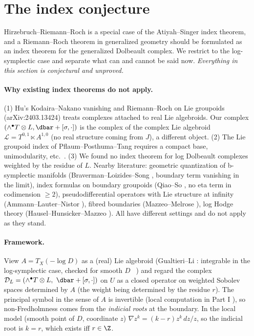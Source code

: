 \section{The index conjecture}\label{sec:index}
Hirzebruch--Riemann--Roch is a special case of the Atiyah--Singer index theorem, and a Riemann--Roch theorem in generalized geometry should be formulated as an index theorem for the generalized Dolbeault complex. We restrict to the log-symplectic case and separate what can and cannot be said now. \emph{Everything in this section is conjectural and unproved.}

\paragraph{Why existing index theorems do not apply.} (1) Hu's Kodaira--Nakano vanishing and Riemann--Roch on Lie groupoids (arXiv:2403.13424) \cite{Hu} treats complexes attached to real Lie algebroids. Our complex $(\wedge^\bullet T\otimes L,\dbar+[\sigma,\cdot])$ is the complex of the complex Lie algebroid $\mathcal L=T^{0,1}\ltimes A^{1,0}$ (no real structure coming from $J$), a different object. (2) The Lie groupoid index of Pflaum--Posthuma--Tang \cite{PPT} requires a compact base, unimodularity, etc.\ \tQ. (3) We found no index theorem for log Dolbeault complexes weighted by the residue of $L$. Nearby literature: geometric quantization of b-symplectic manifolds (Braverman--Loizides--Song \cite{BLS}, boundary term vanishing in the limit), index formulas on boundary groupoids (Qiao--So \cite{QS}, no eta term in codimension $\ge2$), pseudodifferential operators with Lie structure at infinity (Ammann--Lauter--Nistor \cite{ALN}), fibred boundaries (Mazzeo--Melrose \cite{MM}), log Hodge theory (Hausel--Hunsicker--Mazzeo \cite{HHM}). All have different settings and do not apply as they stand.

\paragraph{Framework.} View $A=T_X(-\log D)$ as a (real) Lie algebroid (Gualtieri--Li \cite{GL}: integrable in the log-symplectic case, checked for smooth $D$ \tC\ \tQ) and regard the complex $\mathcal D_L=(\wedge^\bullet T\otimes L,\ \dbar+[\sigma,\cdot])$ on $U$ as a closed operator on weighted Sobolev spaces determined by $A$ (the weight being determined by the residue $r$). The principal symbol in the sense of $A$ is invertible (local computation in Part I \tV), so non-Fredholmness comes from the \emph{indicial roots} at the boundary. In the local model (smooth point of $D$, coordinate $z$) $\nabla z^k=(k-r)z^k\,dz/z$, so the indicial root is $k=r$, which exists iff $r\in\Z$.

